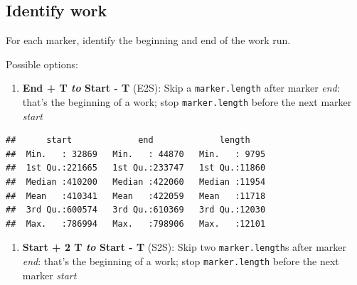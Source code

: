\documentclass[]{article}
\newenvironment{Shaded}{\begin{snugshade}}{\end{snugshade}}
\newcommand{\KeywordTok}[1]{\textcolor[rgb]{0.13,0.29,0.53}{\textbf{{#1}}}}
\newcommand{\DataTypeTok}[1]{\textcolor[rgb]{0.13,0.29,0.53}{{#1}}}
\newcommand{\DecValTok}[1]{\textcolor[rgb]{0.00,0.00,0.81}{{#1}}}
\newcommand{\StringTok}[1]{\textcolor[rgb]{0.31,0.60,0.02}{{#1}}}
\newcommand{\NormalTok}[1]{{#1}}
\begin{document}
\subsection{Identify work}\label{identify-work}

For each marker, identify the beginning and end of the work run.

Possible options:

\begin{enumerate}
\def\labelenumi{\arabic{enumi}.}
\itemsep1pt\parskip0pt
\item
  \textbf{End + T \emph{to} Start - T} (E2S): Skip a
  \texttt{marker.length} after marker \emph{end}: that's the beginning
  of a work; stop \texttt{marker.length} before the next marker
  \emph{start}
\end{enumerate}

\begin{Shaded}
\end{Shaded}

\begin{verbatim}
##      start             end             length     
##  Min.   : 32869   Min.   : 44870   Min.   : 9795  
##  1st Qu.:221665   1st Qu.:233747   1st Qu.:11860  
##  Median :410200   Median :422060   Median :11954  
##  Mean   :410341   Mean   :422059   Mean   :11718  
##  3rd Qu.:600574   3rd Qu.:610369   3rd Qu.:12030  
##  Max.   :786994   Max.   :798906   Max.   :12101
\end{verbatim}

\begin{enumerate}
\def\labelenumi{\arabic{enumi}.}
\setcounter{enumi}{1}
\itemsep1pt\parskip0pt
\item
  \textbf{Start + 2 T \emph{to} Start - T} (S2S): Skip two
  \texttt{marker.length}s after marker \emph{end}: that's the beginning
  of a work; stop \texttt{marker.length} before the next marker
  \emph{start}
\end{enumerate}
\end{document}
